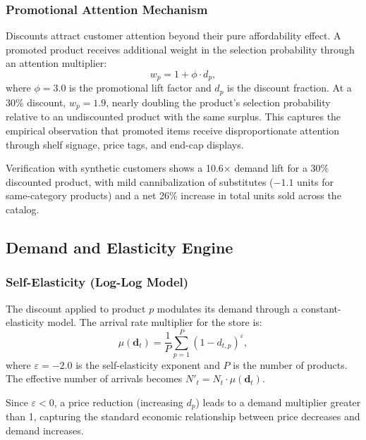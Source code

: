 \documentclass[11pt,a4paper]{article}
\begin{document}
\subsubsection{Promotional Attention Mechanism}

Discounts attract customer attention beyond their pure affordability effect.
A promoted product receives additional weight in the selection probability through an attention multiplier:
\begin{equation}
w_p = 1 + \phi \cdot d_p,
\end{equation}
where $\phi = 3.0$ is the promotional lift factor and $d_p$ is the discount fraction.
At a 30\% discount, $w_p = 1.9$, nearly doubling the product's selection probability relative to an undiscounted product with the same surplus.
This captures the empirical observation that promoted items receive disproportionate attention through shelf signage, price tags, and end-cap displays.

Verification with synthetic customers shows a 10.6$\times$ demand lift for a 30\% discounted product, with mild cannibalization of substitutes ($-1.1$ units for same-category products) and a net 26\% increase in total units sold across the catalog.

\subsection{Demand and Elasticity Engine}

\subsubsection{Self-Elasticity (Log-Log Model)}

The discount applied to product $p$ modulates its demand through a constant-elasticity model. The arrival rate multiplier for the store is:
\begin{equation}
\mu(\mathbf{d}_t) = \frac{1}{P}\sum_{p=1}^{P} (1 - d_{t,p})^{\varepsilon},
\end{equation}
where $\varepsilon = -2.0$ is the self-elasticity exponent and $P$ is the number of products.
The effective number of arrivals becomes $N'_t = N_t \cdot \mu(\mathbf{d}_t)$.

Since $\varepsilon < 0$, a price reduction (increasing $d_p$) leads to a demand multiplier greater than 1, capturing the standard economic relationship between price decreases and demand increases.
\end{document}
